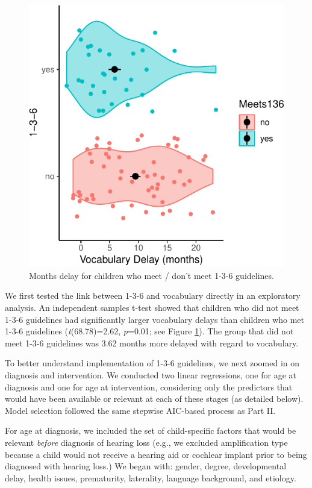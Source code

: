 \documentclass[english,man]{apa6}
\begin{document}
\begin{figure}
\centering
\includegraphics{ELSSP_paper_files/figure-latex/delay-violins-1.pdf}
\caption{\label{fig:delay-violins}Months delay for children who meet / don't meet 1-3-6 guidelines.}
\end{figure}

We first tested the link between 1-3-6 and vocabulary directly in an exploratory analysis. An independent samples t-test showed that children who did not meet 1-3-6 guidelines had significantly larger vocabulary delays than children who met 1-3-6 guidelines (\emph{t}(68.78)=2.62, \emph{p}=0.01; see Figure \ref{fig:delay-violins}). The group that did not meet 1-3-6 guidelines was 3.62 months more delayed with regard to vocabulary.

To better understand implementation of 1-3-6 guidelines, we next zoomed in on diagnosis and intervention. We conducted two linear regressions, one for age at diagnosis and one for age at intervention, considering only the predictors that would have been available or relevant at each of these stages (as detailed below). Model selection followed the same stepwise AIC-based process as Part II.

For age at diagnosis, we included the set of child-specific factors that would be relevant \emph{before} diagnosis of hearing loss (e.g., we excluded amplification type because a child would not receive a hearing aid or cochlear implant prior to being diagnosed with hearing loss.) We began with: gender, degree, developmental delay, health issues, prematurity, laterality, language background, and etiology.
\end{document}

